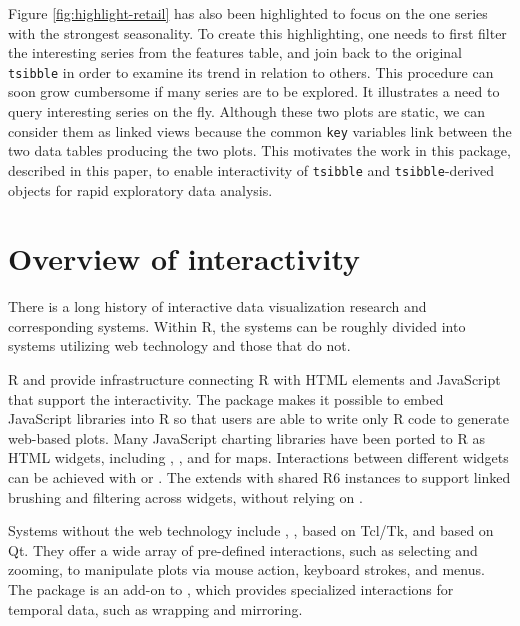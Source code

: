 Figure \ref{fig:highlight-retail} has also been highlighted to focus on
the one series with the strongest seasonality. To create this
highlighting, one needs to first filter the interesting series from the
features table, and join back to the original \texttt{tsibble} in order
to examine its trend in relation to others. This procedure can soon grow
cumbersome if many series are to be explored. It illustrates a need to
query interesting series on the fly. Although these two plots are
static, we can consider them as linked views because the common
\texttt{key} variables link between the two data tables producing the
two plots. This motivates the work in this package, described in this
paper, to enable interactivity of \texttt{tsibble} and
\texttt{tsibble}-derived objects for rapid exploratory data analysis.

\hypertarget{overview-of-interactivity}{%
\section{Overview of interactivity}\label{overview-of-interactivity}}

There is a long history of interactive data visualization research and
corresponding systems. Within R, the systems can be roughly divided into
systems utilizing web technology and those that do not.

R  \citep{R-shiny} and 
\citep{R-htmlwidgets} provide infrastructure connecting R with HTML
elements and JavaScript that support the interactivity. The
 package makes it possible to embed JavaScript
libraries into R so that users are able to write only R code to generate
web-based plots. Many JavaScript charting libraries have been ported to
R as HTML widgets, including  \citep{plotly2020},
 \citep{R-rbokeh}, and 
\citep{R-leaflet} for maps. Interactions between different widgets can
be achieved with  or 
\citep{R-crosstalk}. The  extends
 with shared R6 instances to support linked
brushing and filtering across widgets, without relying on
.

Systems without the web technology include ,
 \citep{R-loon}, based on Tcl/Tk, and 
\citep{xie_reactive_2014} based on Qt. They offer a wide array of
pre-defined interactions, such as selecting and zooming, to manipulate
plots via mouse action, keyboard strokes, and menus. The
 package \citep{cheng_enabling_2016} is an add-on to
, which provides specialized interactions for temporal
data, such as wrapping and mirroring.

